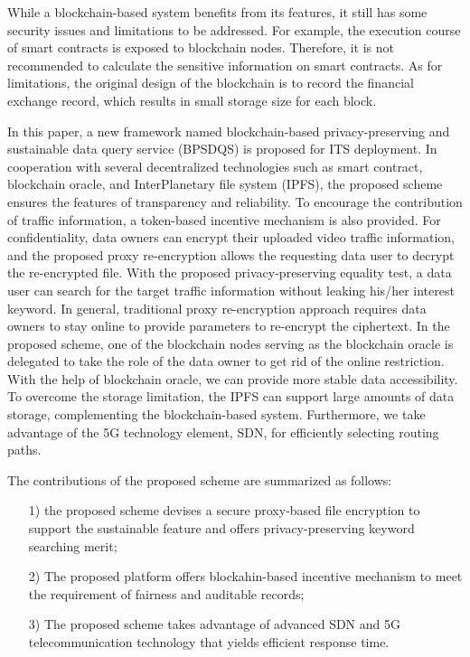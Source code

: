 \documentclass[journal,10pt]{IEEEtran}
\begin{document}
While a blockchain-based system benefits from its features, it still has some security issues and limitations to be addressed\cite{A survey on the security of blockchain systems}\cite{A blockchain construct for energy trading against sybil attacks}\cite{Regional blockchain for vehicular networks to prevent 51 attacks}. For example, the execution course of smart contracts is exposed to blockchain nodes. Therefore, it is not recommended to calculate the sensitive information on smart contracts. As for limitations, the original design of the blockchain is to record the financial exchange record, which results in small storage size for each block.    

In this paper, a new framework named blockchain-based privacy-preserving and sustainable data query service (BPSDQS) is proposed for ITS deployment. In cooperation with several decentralized technologies such as smart contract, blockchain oracle, and InterPlanetary file system (IPFS), the proposed scheme ensures the features of transparency and reliability. To encourage the contribution of traffic information, a token-based incentive mechanism is also provided. For confidentiality, data owners can encrypt their uploaded video traffic information, and the proposed proxy re-encryption allows the requesting data user to decrypt the re-encrypted file. With the proposed privacy-preserving equality test, a data user can search for the target traffic information without leaking his/her interest keyword. In general, traditional proxy re-encryption approach requires data owners to stay online to provide parameters to re-encrypt the ciphertext. In the proposed scheme, one of the blockchain nodes serving as the blockchain oracle is delegated to take the role of the data owner to get rid of the online restriction. With the help of blockchain oracle, we can provide more stable data accessibility. To overcome the storage limitation, the IPFS can support large amounts of data storage, complementing the blockchain-based system. Furthermore, we take advantage of the 5G technology element, SDN, for efficiently selecting routing paths. 

The contributions of the proposed scheme are summarized as follows: 
\begin{itemize}
  \item [1)]
  the proposed scheme devises a secure proxy-based file encryption to support the sustainable feature and offers privacy-preserving keyword searching merit; 
  \item [2)]
  The proposed platform offers blockahin-based incentive mechanism to meet the requirement of fairness and auditable records; 
  \item [3)]
  The proposed scheme takes advantage of advanced SDN and 5G telecommunication technology that yields efficient response time. 
\end{itemize}
\end{document}
